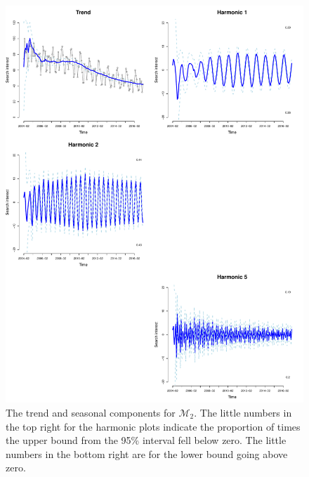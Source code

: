 \documentclass[12pt]{article}
\begin{document}
\begin{figure}[H]
\begin{center}
\includegraphics[scale=0.40]{figs/m2_components.pdf}
\end{center}
\caption{The trend and seasonal components for $\mathcal{M}_2$. The little numbers in the top right for the harmonic plots indicate the proportion of times the upper bound from the 95\% interval fell below zero. The little numbers in the bottom right are for the lower bound going above zero.}
\end{figure}
\end{document}
